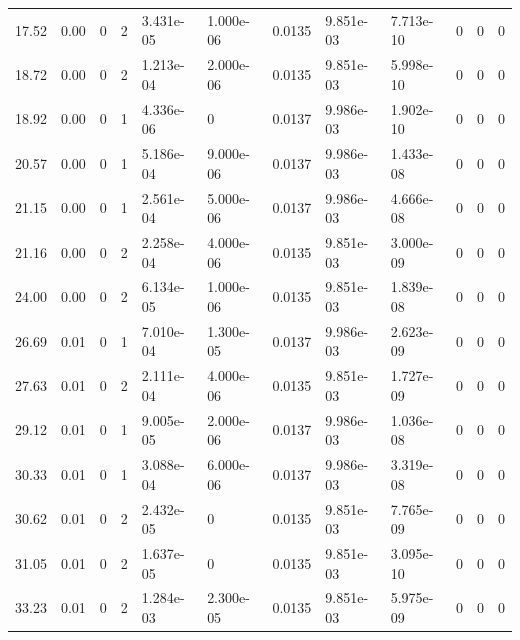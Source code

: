 \documentclass[preview]{standalone}
\begin{document}
{{\begin{tabular}{L{1.2cm}C{1.2cm} C{0.3cm}C{0.5cm} C{1.4cm}C{1.4cm} C{1.4cm}C{1.4cm} C{1.6cm}C{1.6cm} C{1.6cm}C{1.6cm}}
  17.52  &  0.00  & 0     &  2 &  3.431e-05  & 1.000e-06  &  0.0135&   9.851e-03& 7.713e-10 & 0   &  0 & 0  \\ 
  18.72  &  0.00  & 0     &  2 &  1.213e-04  & 2.000e-06  &  0.0135&   9.851e-03& 5.998e-10 & 0   &  0 & 0  \\ 
  18.92  &  0.00  & 0     &  1 &  4.336e-06  & 0  &  0.0137&   9.986e-03& 1.902e-10 & 0   &  0 & 0  \\ 
  20.57  &  0.00  & 0     &  1 &  5.186e-04  & 9.000e-06  &  0.0137&   9.986e-03& 1.433e-08 & 0   &  0 & 0  \\ 
  21.15  &  0.00  & 0     &  1 &  2.561e-04  & 5.000e-06  &  0.0137&   9.986e-03& 4.666e-08 & 0   &  0 & 0  \\ 
  21.16  &  0.00  & 0     &  2 &  2.258e-04  & 4.000e-06  &  0.0135&   9.851e-03& 3.000e-09 & 0   &  0 & 0  \\ 
  24.00  &  0.00  & 0     &  2 &  6.134e-05  & 1.000e-06  &  0.0135&   9.851e-03& 1.839e-08 & 0   &  0 & 0  \\ 
  26.69  &  0.01  & 0     &  1 &  7.010e-04  & 1.300e-05  &  0.0137&   9.986e-03& 2.623e-09 & 0   &  0 & 0  \\ 
  27.63  &  0.01  & 0     &  2 &  2.111e-04  & 4.000e-06  &  0.0135&   9.851e-03& 1.727e-09 & 0   &  0 & 0  \\ 
  29.12  &  0.01  & 0     &  1 &  9.005e-05  & 2.000e-06  &  0.0137&   9.986e-03& 1.036e-08 & 0   &  0 & 0  \\ 
  30.33  &  0.01  & 0     &  1 &  3.088e-04  & 6.000e-06  &  0.0137&   9.986e-03& 3.319e-08 & 0   &  0 & 0  \\ 
  30.62  &  0.01  & 0     &  2 &  2.432e-05  & 0  &  0.0135&   9.851e-03& 7.765e-09 & 0   &  0 & 0  \\ 
  31.05  &  0.01  & 0     &  2 &  1.637e-05  & 0  &  0.0135&   9.851e-03& 3.095e-10 & 0   &  0 & 0  \\ 
  33.23  &  0.01  & 0     &  2 &  1.284e-03  & 2.300e-05  &  0.0135&   9.851e-03& 5.975e-09 & 0   &  0 & 0  \\ 
\hline 
\end{tabular} 

}}
\end{document}

